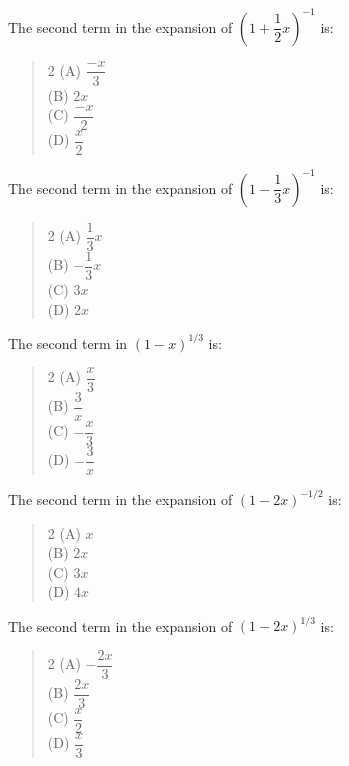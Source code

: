 \documentclass[11pt,a4paper]{article}
\begin{document}
\begin{mcqlist}
\item The second term in the expansion of $\left(1+\dfrac{1}{2}x\right)^{-1}$ is:
\begin{quote}\begin{multicols}{2}
\noindent (A) $\dfrac{-x}{3}$ \\
(B) $2x$ \\
(C) $\dfrac{-x}{2}$ \\
(D) $\dfrac{x}{2}$
\end{multicols}\end{quote}

\item The second term in the expansion of $\left(1-\dfrac{1}{3}x\right)^{-1}$ is:
\begin{quote}\begin{multicols}{2}
\noindent (A) $\dfrac{1}{3}x$ \\
(B) $-\dfrac{1}{3}x$ \\
(C) $3x$ \\
(D) $2x$
\end{multicols}\end{quote}

\item The second term in $(1-x)^{1/3}$ is:
\begin{quote}\begin{multicols}{2}
\noindent (A) $\dfrac{x}{3}$ \\
(B) $\dfrac{3}{x}$ \\
(C) $-\dfrac{x}{3}$ \\
(D) $-\dfrac{3}{x}$
\end{multicols}\end{quote}

\item The second term in the expansion of $(1-2x)^{-1/2}$ is:
\begin{quote}\begin{multicols}{2}
\noindent (A) $x$ \\
(B) $2x$ \\
(C) $3x$ \\
(D) $4x$
\end{multicols}\end{quote}

\item The second term in the expansion of $(1-2x)^{1/3}$ is:
\begin{quote}\begin{multicols}{2}
\noindent (A) $-\dfrac{2x}{3}$ \\
(B) $\dfrac{2x}{3}$ \\
(C) $\dfrac{x}{2}$ \\
(D) $\dfrac{x}{3}$
\end{multicols}\end{quote}


\end{mcqlist}
\end{document}
